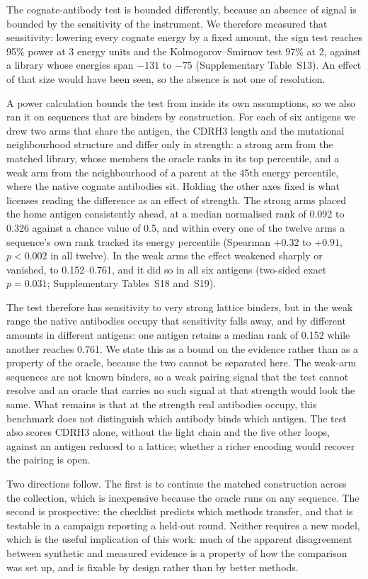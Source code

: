\documentclass[pdflatex,sn-nature]{sn-jnl}
\theoremstyle{thmstyleone}
\theoremstyle{thmstyletwo}
\theoremstyle{thmstylethree}
\begin{document}
The cognate-antibody test is bounded differently, because an absence of signal
is bounded by the sensitivity of the instrument. We therefore measured that
sensitivity: lowering every cognate energy by a fixed amount, the sign test
reaches 95\% power at 3 energy units and the Kolmogorov--Smirnov test 97\% at
2, against a library whose energies span $-131$ to $-75$ (Supplementary
Table~S13). An effect of that size would have been seen, so the absence is not
one of resolution.

A power calculation bounds the test from inside its own assumptions, so we also
ran it on sequences that are binders by construction. For each of six antigens
we drew two arms that share the antigen, the CDRH3 length and the mutational
neighbourhood structure and differ only in strength: a strong arm from the
matched library, whose members the oracle ranks in its top percentile, and a
weak arm from the neighbourhood of a parent at the 45th energy percentile,
where the native cognate antibodies sit. Holding the other axes fixed is what
licenses reading the difference as an effect of strength. The strong arms
placed the home antigen consistently ahead, at a median normalised rank of
0.092 to 0.326 against a chance value of 0.5, and within every one of the
twelve arms a sequence's own rank tracked its energy percentile (Spearman
$+0.32$ to $+0.91$, $p < 0.002$ in all twelve). In the weak arms the effect
weakened sharply or vanished, to 0.152--0.761, and it did so in all six
antigens (two-sided exact $p = 0.031$; Supplementary Tables~S18 and~S19).

The test therefore has sensitivity to very strong lattice binders, but in the
weak range the native antibodies occupy that sensitivity falls away, and by
different amounts in different antigens: one antigen retains a median rank of
0.152 while another reaches 0.761. We state this as a bound on the evidence
rather than as a property of the oracle, because the two cannot be separated
here. The weak-arm sequences are not known binders, so a weak pairing signal
that the test cannot resolve and an oracle that carries no such signal at that
strength would look the same. What remains is that at the strength real
antibodies occupy, this benchmark does not distinguish which antibody binds
which antigen. The test also scores CDRH3 alone, without the light chain and
the five other loops, against an antigen reduced to a lattice; whether a richer
encoding would recover the pairing is open.

Two directions follow. The first is to continue the matched construction across
the collection, which is inexpensive because the oracle runs on any sequence.
The second is prospective: the checklist predicts which methods transfer, and
that is testable in a campaign reporting a held-out round. Neither requires a
new model, which is the useful implication of this work: much of the apparent
disagreement between synthetic and measured evidence is a property of how the
comparison was set up, and is fixable by design rather than by better methods.
\end{document}

